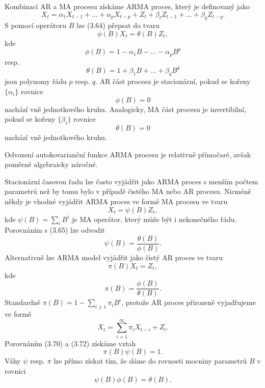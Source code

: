 Kombinací AR a MA procesu získáme ARMA proces, který je definovaný jako
\begin{equation}
X_t = \alpha_1 X_{t - 1} + ... + \alpha_p X_{t - p} + Z_t + \beta_t Z_{t - 1} + ... + \beta_q Z_{t - q}.
\end{equation}
S pomocí operátoru $B$ lze (3.64) přepsat do tvaru
\begin{equation}
\phi(B)X_t = \theta(B) Z_t,
\end{equation}
kde
\begin{equation}
\phi(B) = 1 - \alpha_1 B - ... - \alpha_p B^p
\end{equation}
resp.
\begin{equation}
\theta(B) = 1 + \beta_1 B + ... + \beta_q B^q
\end{equation}
jsou polynomy řádu $p$ resp. $q$. AR část procesu je stacionární, pokud se kořeny $\{\alpha_i\}$ rovnice
\begin{equation}
\phi(B) = 0
\end{equation}
nachází vně jednotkového kruhu. Analogicky, MA část procesu je invertibilní, pokud se kořeny $\{\beta_i\}$ rovnice
\begin{equation}
\theta(B) = 0
\end{equation}
nachází vně jednotkového kruhu.

Odvození autokovarianční funkce ARMA procesu je relativně přímočaré, avšak poměrně algebraicky náročné.

Stacionární časovou řadu lze často vyjádřit jako ARMA proces s menším počtem parametrů než by tomu bylo v případě čistého MA nebo AR procesu. Nicméně někdy je vhodné vyjádřit ARMA proces ve formě MA procesu ve tvaru
\begin{equation}
X_t = \psi(B)Z_t, 
\end{equation}
kde $\psi(B) = \sum_i B^i$ je MA operátor, který může být i nekonečného řádu. Porovnáním s (3.65) lze odvodit
\begin{equation}
\psi(B) = \frac{\theta(B)}{\phi(B)}.
\end{equation}
Alternativně lze ARMA model vyjádřit jako čistý AR proces ve tvaru
\begin{equation}
\pi(B)X_t = Z_t,
\end{equation}
kde
\begin{equation}
\pi(B) = \frac{\phi(B)}{\theta(B)}.
\end{equation}
Standardně $\pi(B) = 1 - \sum_{i \ge 1} \pi_i B^i$, protože AR proces přirozeně vyjadřujeme ve formě
\begin{equation}
X_t = \sum_{i = 1}^{\infty} \pi_i X_{t - i} + Z_t.
\end{equation}
Porovnáním (3.70) a (3.72) získáme vztah
\begin{equation}
\pi(B) \psi(B) = 1.
\end{equation}
Váhy $\psi$ resp. $\pi$ lze přímo získat tím, že dáme do rovnosti mocniny parametrů $B$ v rovnici
\begin{equation}
\psi(B) \phi(B) = \theta(B).
\end{equation}


